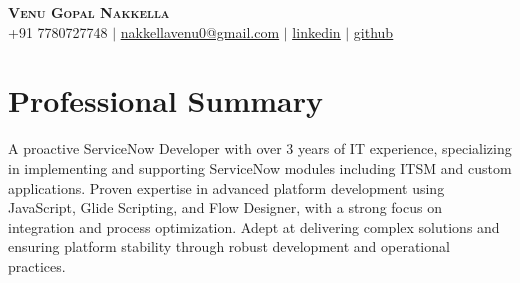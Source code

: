 \documentclass[letterpaper,11pt]{article}
\begin{document}
\begin{center}
    \textbf{\Huge \scshape Venu Gopal Nakkella} \\ \vspace{1pt}
    \small +91 7780727748 $|$ \href{mailto:nakkellavenu0@gmail.com}{\underline{nakkellavenu0@gmail.com}} $|$
    \href{https://www.linkedin.com/in/venu-gopal-nakkella-a78a3b21a/}{\underline{linkedin}} $|$
    \href{https://github.com/venugopalnakkella}{\underline{github}}
\end{center}
\section{Professional Summary}
A proactive ServiceNow Developer with over 3 years of IT experience, specializing in implementing and supporting ServiceNow modules including ITSM and custom applications. Proven expertise in advanced platform development using JavaScript, Glide Scripting, and Flow Designer, with a strong focus on integration and process optimization. Adept at delivering complex solutions and ensuring platform stability through robust development and operational practices.
\end{document}
